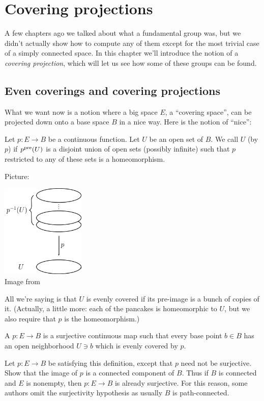 \chapter{Covering projections}
A few chapters ago we talked about what a fundamental group was,
but we didn't actually show how to compute any of them
except for the most trivial case of a simply connected space.
In this chapter we'll introduce the notion of a \emph{covering projection},
which will let us see how some of these groups can be found.

\section{Even coverings and covering projections}
What we want now is a notion where a big space $E$, a ``covering space'',
can be projected down onto a base space $B$ in a nice way.
Here is the notion of ``nice'':
\begin{definition}
	Let $p : E \to B$ be a continuous function.
	Let $U$ be an open set of $B$.
	We call $U$  (by $p$) if $p^{\text{pre}}(U)$ is a disjoint union of open sets (possibly infinite) such that $p$ restricted to any of these sets is a homeomorphism.
\end{definition}
Picture:
\begin{center}
	\includegraphics[width=4cm]{media/even-covering.png}
	\\ \scriptsize Image from \cite{img:even_covering}
\end{center}
All we're saying is that $U$ is evenly covered if its pre-image
is a bunch of copies of it. (Actually, a little more: each of the pancakes is homeomorphic to $U$, but we also require that $p$ is the homeomorphism.)

\begin{definition}
	A  $p : E \to B$
	is a surjective continuous map such that every base point $b \in B$
	has an open neighborhood $U \ni b$ which is evenly covered by $p$.
\end{definition}
\begin{exercise}
	Let $p \colon E \to B$ be satisfying this definition,
	except that $p$ need not be surjective.
	Show that the image of $p$ is a connected component of $B$.
	Thus if $B$ is connected and $E$ is nonempty,
	then $p \colon E \to B$ is already surjective.
	For this reason, some authors omit the surjectivity hypothesis
	as usually $B$ is path-connected.
\end{exercise}

